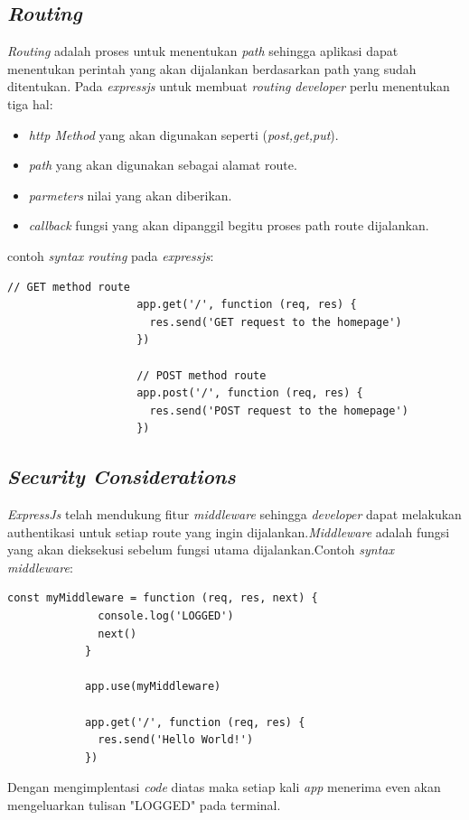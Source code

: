 \subsection{\textit{Routing}}
\textit{Routing} adalah proses untuk menentukan \textit{path} sehingga aplikasi dapat menentukan perintah yang akan dijalankan berdasarkan path yang sudah ditentukan.\cite{RFC:1332} Pada \textit{expressjs} untuk membuat \textit{routing} \textit{developer} perlu menentukan tiga hal\cite{Express:01:routing}:

\begin{itemize}
    \item \textit{ http Method} yang akan digunakan seperti (\textit{post,get,put}).
    \item \textit{path} yang akan digunakan sebagai alamat route.
    \item \textit{parmeters} nilai yang akan diberikan.
    \item \textit{callback} fungsi yang akan dipanggil begitu proses path route dijalankan. 
\end{itemize}
contoh \textit{syntax routing} pada \textit{expressjs}:
\begin{lstlisting}[]
            // GET method route
                    app.get('/', function (req, res) {
                      res.send('GET request to the homepage')
                    })
                    
                    // POST method route
                    app.post('/', function (req, res) {
                      res.send('POST request to the homepage')
                    })
\end{lstlisting} 

\subsection{\textit{Security Considerations}}
\textit{ExpressJs} telah mendukung fitur \textit{middleware} \cite{Express:01:Security} sehingga \textit{developer} dapat melakukan authentikasi untuk setiap route yang ingin dijalankan.\textit{Middleware} adalah fungsi yang akan dieksekusi sebelum fungsi utama dijalankan.Contoh \textit{syntax middleware}:
\begin{lstlisting}[]
            const myMiddleware = function (req, res, next) {
              console.log('LOGGED')
              next()
            }
            
            app.use(myMiddleware)
            
            app.get('/', function (req, res) {
              res.send('Hello World!')
            })

\end{lstlisting}
Dengan mengimplentasi \textit{code } diatas maka setiap kali \textit{app} menerima even akan mengeluarkan tulisan "LOGGED" pada terminal.



